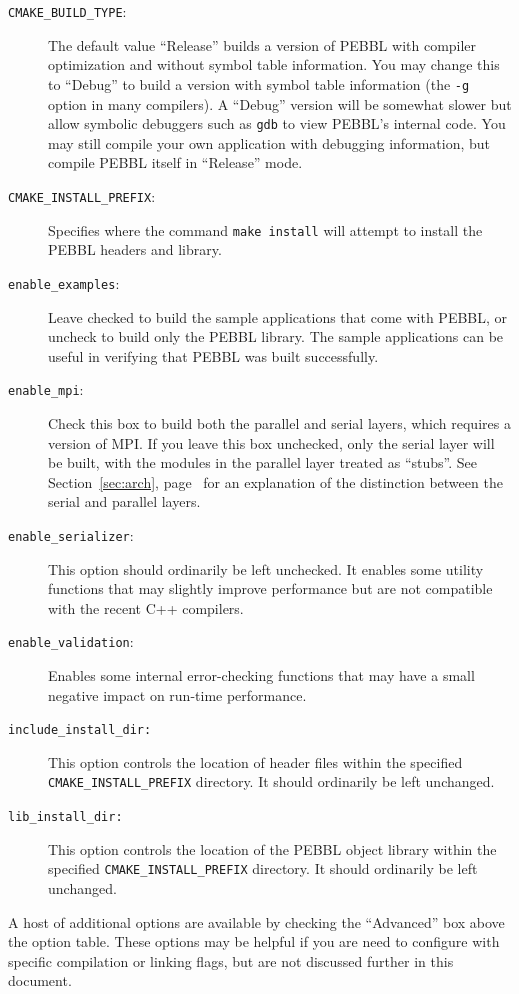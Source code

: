 \begin{description}
\item[\texttt{CMAKE\_BUILD\_TYPE}:] The default value ``Release'' builds a
version of PEBBL with compiler optimization and without symbol table
information.  You may change this to ``Debug'' to build a version with symbol
table information (the \texttt{-g} option in many compilers).  A ``Debug''
version will be somewhat slower but allow symbolic debuggers such as
\texttt{gdb} to view PEBBL's internal code.  You may still compile your own
application with debugging information, but compile PEBBL itself in
``Release'' mode.
\item[\texttt{CMAKE\_INSTALL\_PREFIX}:] Specifies where the command
\texttt{make install} will attempt to install the PEBBL headers and library.
\item[\texttt{enable\_examples}:]  Leave checked to build the sample
applications that come with PEBBL, or uncheck to build only the PEBBL library.
The sample applications can be useful in verifying that PEBBL was built
successfully. 
\item[\texttt{enable\_mpi}:]  Check this box to build both the parallel and
serial layers, which requires a version of MPI.  If you leave this box
unchecked, only the serial layer will be built, with the modules in the
parallel layer treated as ``stubs''.  See Section~\ref{sec:arch},
page~\pageref{sec:arch} for an explanation of the distinction between the
serial and parallel layers.
\item[\texttt{enable\_serializer}:]  This option should ordinarily be left
unchecked.  It enables some utility functions that may slightly improve
performance but are not compatible with the recent C++ compilers.
\item[\texttt{enable\_validation}:]  Enables some internal error-checking
functions that may have a small negative impact on run-time performance.
\item[\texttt{include\_install\_dir:}] This option controls the location of
header files within the specified \texttt{CMAKE\_INSTALL\_PREFIX} directory.
It should ordinarily be left unchanged.
\item[\texttt{lib\_install\_dir:}] This option controls the location of the
PEBBL object library within the specified \texttt{CMAKE\_INSTALL\_PREFIX} directory.
It should ordinarily be left unchanged.
\end{description}
A host of additional options are available by checking the ``Advanced'' box
above the option table.  These options may be helpful if you are need to
configure with specific compilation or linking flags, but are not discussed
further in this document.

